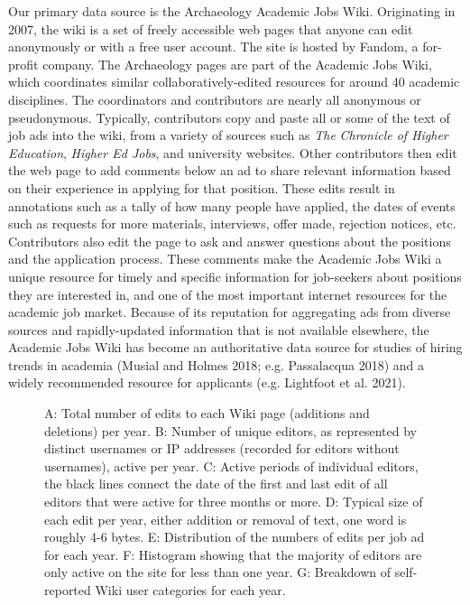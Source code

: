 \documentclass[
  12pt,
]{article}
\begin{document}
Our primary data source is the Archaeology Academic Jobs Wiki.
Originating in 2007, the wiki is a set of freely accessible web pages
that anyone can edit anonymously or with a free user account. The site
is hosted by Fandom, a for-profit company. The Archaeology pages are
part of the Academic Jobs Wiki, which coordinates similar
collaboratively-edited resources for around 40 academic disciplines. The
coordinators and contributors are nearly all anonymous or pseudonymous.
Typically, contributors copy and paste all or some of the text of job
ads into the wiki, from a variety of sources such as \emph{The}
\emph{Chronicle of Higher Education}, \emph{Higher Ed Jobs}, and
university websites. Other contributors then edit the web page to add
comments below an ad to share relevant information based on their
experience in applying for that position. These edits result in
annotations such as a tally of how many people have applied, the dates
of events such as requests for more materials, interviews, offer made,
rejection notices, etc. Contributors also edit the page to ask and
answer questions about the positions and the application process. These
comments make the Academic Jobs Wiki a unique resource for timely and
specific information for job-seekers about positions they are interested
in, and one of the most important internet resources for the academic
job market. Because of its reputation for aggregating ads from diverse
sources and rapidly-updated information that is not available elsewhere,
the Academic Jobs Wiki has become an authoritative data source for
studies of hiring trends in academia (Musial and Holmes 2018; e.g.
Passalacqua 2018) and a widely recommended resource for applicants (e.g.
Lightfoot et al. 2021).

\begin{figure}


\caption{\label{fig-panel-wiki-characteristics}A: Total number of edits
to each Wiki page (additions and deletions) per year. B: Number of
unique editors, as represented by distinct usernames or IP addresses
(recorded for editors without usernames), active per year. C: Active
periods of individual editors, the black lines connect the date of the
first and last edit of all editors that were active for three months or
more. D: Typical size of each edit per year, either addition or removal
of text, one word is roughly 4-6 bytes. E: Distribution of the numbers
of edits per job ad for each year. F: Histogram showing that the
majority of editors are only active on the site for less than one year.
G: Breakdown of self-reported Wiki user categories for each year.}

\end{figure}%
\end{document}
